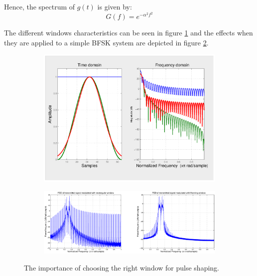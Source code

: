 \documentclass[12pt,a4paper,openright]{report}
\begin{document}
  Hence, the spectrum of $g(t)$ is given by: 
\begin{equation}
G(f) = {e^{ - {\alpha ^2}{f^2}}}
\end{equation}

The different windows characteristics can be seen in figure \ref{fig:wc} and the effects when they are applied to a simple BFSK system are depicted in figure \ref{fig:wcomp}.
 \begin{figure}[H]
 \centering
  \label{fig:wincar}
\begin{subfigure}[H]{1\textwidth}
 \centering
    \includegraphics[scale=0.45, trim=0 0 30cm 0, clip=true]{wincomp.eps}
    \label{fig:wc}
\end{subfigure}

\qquad
\qquad

\begin{subfigure}[H]{1\textwidth}
 \centering
    \includegraphics[scale=0.38]{txwinrectVShann.eps}
    \label{fig:wcomp}
    
    \end{subfigure}
    
    \caption[The importance of choosing the right window for pulse shaping]{The importance of choosing the right window for pulse shaping.}
    \label{fig:main}
\end{figure}
\end{document}
